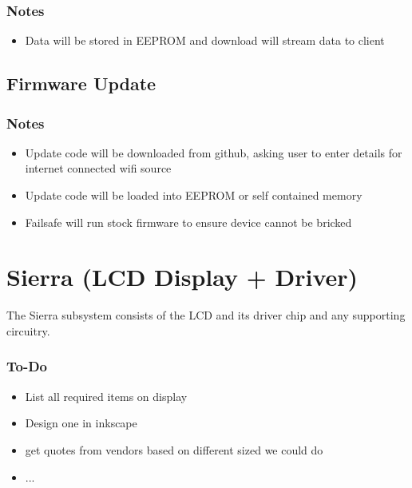 \documentclass{article}
\begin{document}
\subsubsection{Notes}
\begin{itemize}
    \item Data will be stored in EEPROM and download will stream data to client
\end{itemize}


\subsection{Firmware Update}
\subsubsection{Notes}
\begin{itemize}
    \item Update code will be downloaded from github, asking user to enter details for internet connected wifi source
    \item Update code will be loaded into EEPROM or self contained memory
    \item Failsafe will run stock firmware to ensure device cannot be bricked
\end{itemize}


\pagebreak















\section{Sierra (LCD Display + Driver)}
The Sierra subsystem consists of the LCD and its driver chip and any supporting circuitry.


\subsubsection{To-Do}
\begin{itemize}
    \item List all required items on display
    \item Design one in inkscape
    \item get quotes from vendors based on different sized we could do
    \item ...
\end{itemize}
\end{document}
